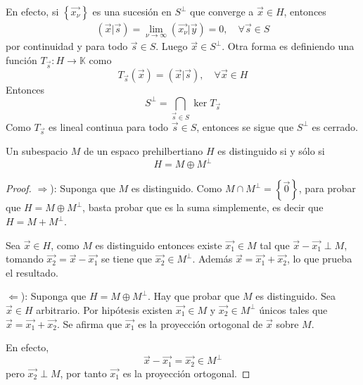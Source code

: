 \documentclass[12pt]{report}
\theoremstyle{largebreak}
\newcommand\cf[3]{\ensuremath{#1:#2\rightarrow#3}}
\newcommand\pint[2]{\ensuremath{\left(#1\big| #2\right)}}
\begin{document}
    \begin{sol}
        En efecto, si $\left\{\vec{x_\nu} \right\}$ es una sucesión en $S^\perp$ que converge a $\vec{x}\in H$, entonces
        \begin{equation*}
            \begin{split}
                \pint{\vec{x}}{\vec{s}}=\lim_{\nu\rightarrow\infty}\pint{\vec{x_\nu}}{\vec{y}}=0,\quad\forall\vec{s}\in S
            \end{split}
        \end{equation*}
        por continuidad y para todo $\vec{s}\in S$. Luego $\vec{x}\in S^\perp$. Otra forma es definiendo una función $\cf{T_{\vec{s}}}{H}{\mathbb{K}}$ como
        \begin{equation*}
            T_{\vec{s}}(\vec{x})=\pint{\vec{x}}{\vec{s}},\quad\forall\vec{x}\in H
        \end{equation*}
        Entonces
        \begin{equation*}
            S^\perp=\bigcap_{\vec{s}\in S}\ker T_{\vec{s}}
        \end{equation*}
        Como $T_{\vec{s}}$ es lineal continua para todo $\vec{s}\in S$, entonces se sigue que $S^\perp$ es cerrado.
    \end{sol}

    \begin{propo}
        Un subespacio $M$ de un espaco prehilbertiano $H$ es distinguido si y sólo si
        \begin{equation*}
            H=M\oplus M^\perp
        \end{equation*}
    \end{propo}

    \begin{proof}
        $\Rightarrow$): Suponga que $M$ es distinguido. Como $M\cap M^\perp=\left\{\vec{0} \right\}$, para probar que $H=M\oplus M^\perp$, basta probar que es la suma simplemente, es decir que $H=M+M^\perp$.
        
        Sea $\vec{x}\in H$, como $M$ es distinguido entonces existe $\vec{x_1}\in M$ tal que $\vec{x}-\vec{x_1}\perp M$, tomando $\vec{x_2}=\vec{x}-\vec{x_1}$ se tiene que $\vec{x_2}\in M^\perp$. Además $\vec{x}=\vec{x_1}+\vec{x_2}$, lo que prueba el resultado.

        $\Leftarrow$): Suponga que $H=M\oplus M^\perp$. Hay que probar que $M$ es distinguido. Sea $\vec{x}\in H$ arbitrario. Por hipótesis existen $\vec{x_1}\in M$ y $\vec{x_2}\in M^\perp$ únicos tales que $\vec{x}=\vec{x_1}+\vec{x_2}$. Se afirma que $\vec{x_1}$ es la proyección ortogonal de $\vec{x}$ sobre $M$. 
        
        En efecto,
        \begin{equation*}
            \vec{x}-\vec{x_1}=\vec{x_2}\in M^\perp
        \end{equation*}
        pero $\vec{x_2}\perp M$, por tanto $\vec{x_1}$ es la proyección ortogonal.
    \end{proof}
\end{document}
